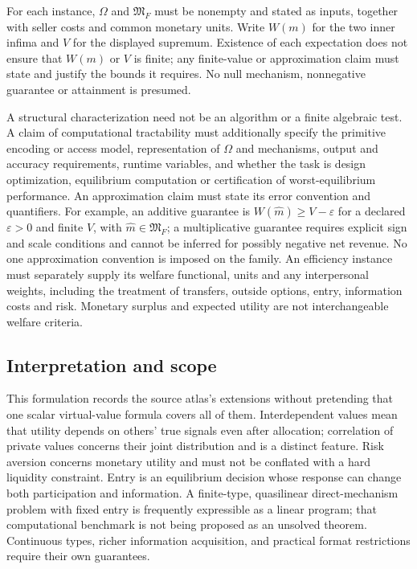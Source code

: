 \documentclass[11pt,a4paper]{article}
\begin{document}
For each instance, $\Omega$ and $\mathfrak M_F$ must be nonempty and stated as inputs, together with seller costs and common monetary units. Write $W(m)$ for the two inner infima and $V$ for the displayed supremum. Existence of each expectation does not ensure that $W(m)$ or $V$ is finite; any finite-value or approximation claim must state and justify the bounds it requires. No null mechanism, nonnegative guarantee or attainment is presumed.

A structural characterization need not be an algorithm or a finite algebraic test. A claim of computational tractability must additionally specify the primitive encoding or access model, representation of $\Omega$ and mechanisms, output and accuracy requirements, runtime variables, and whether the task is design optimization, equilibrium computation or certification of worst-equilibrium performance. An approximation claim must state its error convention and quantifiers. For example, an additive guarantee is $W(\widehat m)\ge V-\varepsilon$ for a declared $\varepsilon>0$ and finite $V$, with $\widehat m\in\mathfrak M_F$; a multiplicative guarantee requires explicit sign and scale conditions and cannot be inferred for possibly negative net revenue. No one approximation convention is imposed on the family. An efficiency instance must separately supply its welfare functional, units and any interpersonal weights, including the treatment of transfers, outside options, entry, information costs and risk. Monetary surplus and expected utility are not interchangeable welfare criteria.

\subsection*{Interpretation and scope}

This formulation records the source atlas's extensions without pretending that one scalar virtual-value formula covers all of them. Interdependent values mean that utility depends on others' true signals even after allocation; correlation of private values concerns their joint distribution and is a distinct feature. Risk aversion concerns monetary utility and must not be conflated with a hard liquidity constraint. Entry is an equilibrium decision whose response can change both participation and information. A finite-type, quasilinear direct-mechanism problem with fixed entry is frequently expressible as a linear program; that computational benchmark is not being proposed as an unsolved theorem. Continuous types, richer information acquisition, and practical format restrictions require their own guarantees.
\end{document}

